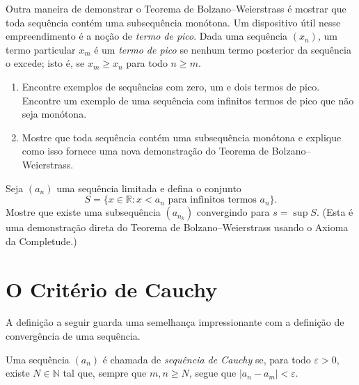 \begin{exercise}\label{ex:2-5-8}
Outra maneira de demonstrar o Teorema de Bolzano--Weierstrass é mostrar que toda sequência contém uma subsequência monótona. Um dispositivo útil nesse empreendimento é a noção de \textit{termo de pico}. Dada uma sequência $(x_n)$, um termo particular $x_m$ é um \textit{termo de pico} se nenhum termo posterior da sequência o excede; isto é, se $x_m \geq x_n$ para todo $n \geq m$. 
\begin{enumerate}[label=(\alph*)]
\item Encontre exemplos de sequências com zero, um e dois termos de pico. Encontre um exemplo de uma sequência com infinitos termos de pico que não seja monótona.
\item Mostre que toda sequência contém uma subsequência monótona e explique como isso fornece uma nova demonstração do Teorema de Bolzano--Weierstrass.
\end{enumerate}
\end{exercise}

\begin{exercise}\label{ex:2-5-9}
Seja $(a_n)$ uma sequência limitada e defina o conjunto
\[
S = \{ x \in \mathbb{R} : x < a_n \text{ para infinitos termos } a_n \}.
\]
Mostre que existe uma subsequência $(a_{n_k})$ convergindo para $s = \sup S$. (Esta é uma demonstração direta do Teorema de Bolzano--Weierstrass usando o Axioma da Completude.)
\end{exercise}


\section{O Critério de Cauchy}\label{sec2:criterio-cauchy}

A definição a seguir guarda uma semelhança impressionante com a definição de convergência de uma sequência.

\begin{definition}\label{def:sequencia-cauchy}
Uma sequência $(a_n)$ é chamada de \textit{sequência de Cauchy} se, para todo $\varepsilon > 0$, existe $N \in \mathbb{N}$ tal que, sempre que $m, n \geq N$, segue que $|a_n - a_m| < \varepsilon$.
\end{definition}

